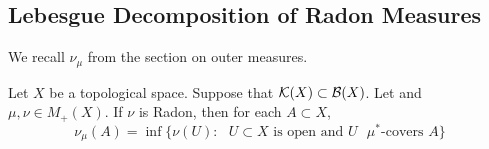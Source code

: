 \documentclass{book}
\begin{document}
	\begin{ex} 
	\end{ex}
























































	\subsection{Lebesgue Decomposition of Radon Measures}
	
	
	\begin{note} 
		We recall $\nu_{\mu}$ from the section on outer measures. \\
	\end{note}

	\begin{ex} 
		Let $X$ be a topological space. Suppose that $\mathcal{K}(X) \subset \mathcal{B}(X)$. Let and $\mu, \nu \in M_+(X)$. If $\nu$ is Radon, then for each $A \subset X$,  
		$$\nu_{\mu}(A) = \inf \{\nu(U): \text{ $U \subset X$ is open and $U$ $\mu^*$-covers $A$} \}$$
	\end{ex}
	
\end{document}
